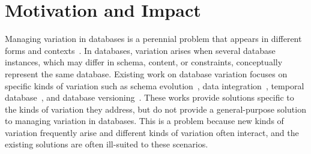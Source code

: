 \section{Motivation and Impact}
\label{sec:mot}


Managing variation in databases is a perennial problem that appears in
different forms and
contexts~\cite{curateVdata,ALW21vamos,ready17cidr,clams16sigmod,datahub15cidr}.
%
In databases, variation arises when several database instances, which may
differ in schema, content, or constraints, conceptually represent the same
database.
%
%
Existing work on database variation focuses on specific kinds of variation such
as schema evolution~\cite{SchEvolRA90McKenzie, schVersioning97Castro,
tempSchEvol91Ariav, tsql95Snodgrass, prima08Moon}, data
integration~\cite{dataIntegBook}, temporal database~\cite{tempDataMng, tempDBSurv, tempDBbook},
and database versioning~\cite{datasetVersioning,dbVersioning}. These works provide solutions
specific to the kinds of variation they address, but do not provide a
general-purpose solution to managing variation in databases.
%
This is a problem because new kinds of variation frequently arise and different
kinds of variation often interact, and the existing solutions are often
ill-suited to these scenarios.




